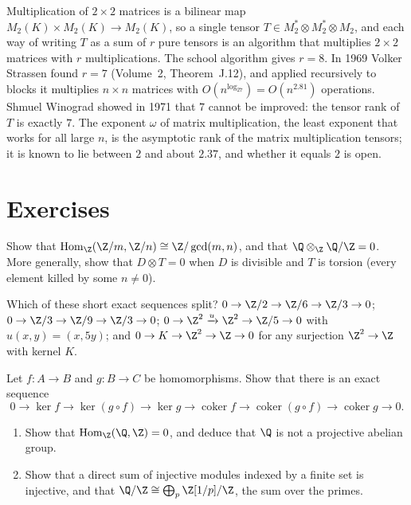 \begin{beauty}
Multiplication of $2\times2$ matrices is a bilinear map $M_2(K)\times M_2(K)\to M_2(K)$, so a single tensor $T\in M_2^*\otimes M_2^*\otimes M_2$, and each way of writing $T$ as a sum of $r$ pure tensors is an algorithm that multiplies
$2\times2$ matrices with $r$ multiplications. The school algorithm gives $r=8$. In 1969 Volker Strassen found $r=7$ (Volume~2, Theorem~J.12), and applied recursively to blocks it multiplies $n\times n$ matrices with
$O(n^{\log_27})=O(n^{2.81})$ operations. Shmuel Winograd showed in 1971 that $7$ cannot be improved: the tensor rank of $T$ is exactly $7$. The exponent $\omega$ of matrix multiplication, the least exponent that works for all
large $n$, is the asymptotic rank of the matrix multiplication tensors; it is known to lie between $2$ and about $2.37$, and whether it equals $2$ is open.
\end{beauty}

\section{Exercises}

\begin{exercise}[$\star$]\label{ex:zmzncomp}
Show that $\operatorname{Hom}_{\Z}(\Z/m,\Z/n)\cong\Z/\gcd(m,n)$, and that $\Q\otimes_{\Z}\Q/\Z=0$. More generally, show that $D\otimes T=0$ when $D$ is divisible and $T$ is torsion (every element killed by some $n\ne0$).
\end{exercise}

\begin{exercise}[$\star$]\label{ex:whichsplit}
Which of these short exact sequences split? $0\to\Z/2\to\Z/6\to\Z/3\to0$; $0\to\Z/3\to\Z/9\to\Z/3\to0$; $0\to\Z^2\xrightarrow{u}\Z^2\to\Z/5\to0$ with $u(x,y)=(x,5y)$; and $0\to K\to\Z^2\to\Z\to0$ for any surjection $\Z^2\to\Z$ with kernel $K$.
\end{exercise}

\begin{exercise}[$\star\star$]\label{ex:composite}
Let $f\colon A\to B$ and $g\colon B\to C$ be homomorphisms. Show that there is an exact sequence
\[0\to\ker f\to\ker(g\circ f)\to\ker g\to\operatorname{coker}f\to\operatorname{coker}(g\circ f)\to\operatorname{coker}g\to0.\]
\end{exercise}

\begin{exercise}[$\star\star$]\label{ex:qnotproj}
\leavevmode
\begin{enumerate}[label=(\alph*)]
\item Show that $\operatorname{Hom}_{\Z}(\Q,\Z)=0$, and deduce that $\Q$ is not a projective abelian group.
\item Show that a direct sum of injective modules indexed by a finite set is injective, and that $\Q/\Z\cong\bigoplus_p\Z[1/p]/\Z$, the sum over the primes.
\end{enumerate}
\end{exercise}


